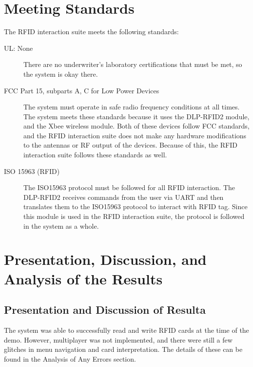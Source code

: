 \documentclass[12pt]{article} %
\begin{document}
\section{Meeting Standards}

The RFID interaction suite meets the following standards:

\begin{description}
	\item[UL: None] There are no underwriter's laboratory certifications that must be met, so the system is okay there.
	\item[FCC Part 15, subparts A, C for Low Power Devices]  The system must operate in safe radio frequency conditions at all times.  The system meets these standards because it uses the DLP-RFID2 module, and the Xbee wireless module.  Both of these devices follow FCC standards, and the RFID interaction suite does not make any hardware modifications to the antennas or RF output of the devices.  Because of this, the RFID interaction suite follows these standards as well.
	\item[ISO 15963 (RFID)] The ISO15963 protocol must be followed for all RFID interaction.  The DLP-RFID2 receives commands from the user via UART and then translates them to the ISO15963 protocol to interact with RFID tag.  Since this module is used in the RFID interaction suite, the protocol is followed in the system as a whole.
\end{description}

\section{Presentation, Discussion, and Analysis of the Results}
%
%
\subsection{Presentation and Discussion of Resulta} %

The system was able to successfully read and write RFID cards at the time of the demo.  However, multiplayer was not implemented, and there were still a few glitches in menu navigation and card interpretation.  The details of these can be found in the Analysis of Any Errors section.
\end{document}
